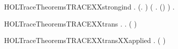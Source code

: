 \newcommand{\HOLTraceTheoremsTRACEXXrules}{\UseVerbatim{HOLTraceTheoremsTRACEXXrules}}
\begin{SaveVerbatim}{HOLTraceTheoremsTRACEXXstrongind}
\HOLTokenTurnstile{} \HOLSymConst{\HOLTokenForall{}}.
       (\HOLSymConst{\HOLTokenForall{}}.   \HOLConst{\ensuremath{\epsilon}} ) \HOLSymConst{\HOLTokenConj{}}
       (\HOLSymConst{\HOLTokenForall{}}    .
             \HOLTokenTransBegin{}\HOLTokenTransEnd {} \HOLSymConst{\HOLTokenConj{}}     \HOLSymConst{\HOLTokenConj{}}     \HOLSymConst{\HOLTokenImp{}}   (\HOLSymConst{::}) ) \HOLSymConst{\HOLTokenImp{}}
       \HOLSymConst{\HOLTokenForall{}}  .     \HOLSymConst{\HOLTokenImp{}}    
\end{SaveVerbatim}
\newcommand{\HOLTraceTheoremsTRACEXXstrongind}{\UseVerbatim{HOLTraceTheoremsTRACEXXstrongind}}
\begin{SaveVerbatim}{HOLTraceTheoremsTRACEXXtrans}
\HOLTokenTurnstile{} \HOLSymConst{\HOLTokenForall{}}  .     \HOLSymConst{\HOLTokenImp{}} \HOLSymConst{\HOLTokenForall{}} .     \HOLSymConst{\HOLTokenImp{}}   ( \HOLSymConst{++} ) 
\end{SaveVerbatim}
\newcommand{\HOLTraceTheoremsTRACEXXtrans}{\UseVerbatim{HOLTraceTheoremsTRACEXXtrans}}
\begin{SaveVerbatim}{HOLTraceTheoremsTRACEXXtransXXapplied}
\HOLTokenTurnstile{} \HOLSymConst{\HOLTokenForall{}}    .
           \HOLSymConst{\HOLTokenConj{}}     \HOLSymConst{\HOLTokenImp{}}   ( \HOLSymConst{++} ) 
\end{SaveVerbatim}
